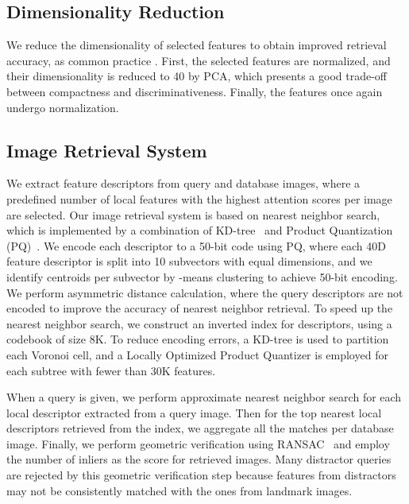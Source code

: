\documentclass[10pt,twocolumn,letterpaper]{article}
\begin{document}
\subsection{Dimensionality Reduction}

We reduce the dimensionality of selected features to obtain improved retrieval accuracy,
as common practice \cite{jegou2012negative}.
First, the selected features are  normalized, and their dimensionality is reduced to 40 by PCA, which presents a good trade-off between compactness and discriminativeness.
Finally, the features once again undergo  normalization.







\subsection{Image Retrieval System}

We extract feature descriptors from query and database images, where a predefined number of local features with the highest attention scores per image are selected.
Our image retrieval system is based on nearest neighbor search, which is implemented by a combination of KD-tree~\cite{bentley75multidimensional} and Product Quantization (PQ)~\cite{jegou2011product}.
We encode each descriptor to a 50-bit code using PQ, where each 40D feature descriptor is split into 10 subvectors with equal dimensions, and we identify  centroids per subvector by -means clustering to achieve 50-bit encoding. 
We perform asymmetric distance calculation, where the query descriptors are not encoded to improve the accuracy of nearest neighbor retrieval.
To speed up the nearest neighbor search, we construct an inverted index for descriptors, using a codebook of size 8K.
To reduce encoding errors, a KD-tree is used to partition each Voronoi cell, and a Locally Optimized Product Quantizer \cite{kalantidis2014locally} is employed for each subtree with fewer than 30K features.





When a query is given, we perform approximate nearest neighbor search for each local descriptor extracted from a query image. 
Then for the top  nearest local descriptors retrieved from the index, we aggregate all the matches per database image. 
Finally, we perform geometric verification using RANSAC~\cite{Fischler1981} and employ the number of inliers as the score for retrieved images.
Many distractor queries are rejected by this geometric verification step because features from distractors may not be consistently matched with the ones from landmark images.
\end{document}

